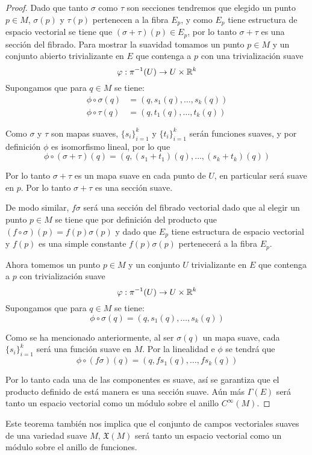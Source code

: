 \begin{proof}
  Dado que tanto $\sigma$ como $\tau$ son secciones tendremos que elegido un punto $p \in M$, $\sigma(p)$ y $\tau(p)$ pertenecen a la fibra $E_p$, y como $E_p$ tiene estructura de espacio vectorial se tiene que $(\sigma + \tau)(p) \in E_p$, por lo tanto $\sigma + \tau$ es una sección del fibrado. Para mostrar la suavidad tomamos un punto $p \in M$ y un conjunto abierto trivializante en $E$ que contenga a $p$ con una trivialización suave 
  \[
    \varphi: \pi^{-1}(U) \to U \times \mathbb{R}^k
  \]
Supongamos que para $q \in M$ se tiene:
\begin{align*}
  \phi \circ \sigma(q) &= (q, s_1(q), \dots, s_k(q))\\
  \phi \circ \tau(q) &= (q, t_1(q), \dots, t_k(q))
\end{align*}

  Como $\sigma$ y $\tau$ son mapas suaves, $\{s_i\}_{i=1}^k$ y  $\{t_i\}_{i=1}^k$ serán funciones suaves, y por definición $\phi$ es isomorfismo lineal, por lo que
\[
  \phi \circ (\sigma + \tau)(q) = (q, (s_1 + t_1)(q), \dots, (s_k + t_k)(q))
\]

  Por lo tanto $\sigma + \tau$ es un mapa suave en cada punto de $U$, en particular será suave en $p$. Por lo tanto $\sigma + \tau$ es una sección suave.

  De modo similar, $f\sigma$ será una sección del fibrado vectorial dado que al elegir un punto $p \in M$ se tiene que por definición del producto que $(f \circ \sigma)(p) = f(p)\sigma(p)$ y dado que $E_p$ tiene estructura de espacio vectorial y $f(p)$ es una simple constante $f(p)\sigma(p)$ pertenecerá a la fibra $E_p$. 

  Ahora tomemos un punto $p \in M$ y un conjunto $U$ trivializante en $E$ que contenga a $p$ con trivialización suave
  \[
    \varphi: \pi^{-1}(U) \to U \times \mathbb{R}^{k}
  \]
  Supongamos que para $q \in M$ se tiene:
  \[
    \phi \circ \sigma(q) = (q, s_1(q), \dots, s_k(q))
  \]

  Como se ha mencionado anteriormente, al ser $\sigma(q)$ un mapa suave, cada $\{s_i\}_{i=1}^k$ será una función suave en $M$. Por la linealidad e $\phi$ se tendrá que 
  \[
    \phi \circ (f \sigma)(q) = (q, fs_1(q),\dots, fs_k(q))
  \]
  
  Por lo tanto cada una de las componentes es suave, así se garantiza que el producto definido de está manera es una sección suave. Aún más $\Gamma(E)$ será tanto un espacio vectorial como un módulo sobre el anillo $C^{\infty}(M)$.
\end{proof}

Este teorema también nos implica que el conjunto de campos vectoriales suaves de una variedad suave $M$, $\mathfrak{X}(M)$ será tanto un espacio vectorial como un módulo sobre el anillo de funciones.
